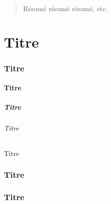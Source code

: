 \documentclass[a4paper]{article}
\title{}
\author{Londeix Raphaël}
\begin{document}
    \begin{abstract}
      Résumé résumé résumé, etc.
    \end{abstract}


    \part{Titre}

    \section{Titre}

    \subsection{Titre}

    \subsubsection{Titre}

    \paragraph{Titre}


    \subparagraph{Titre}

    \appendix

    \section{Titre}

    \section{Titre}
\end{document}
